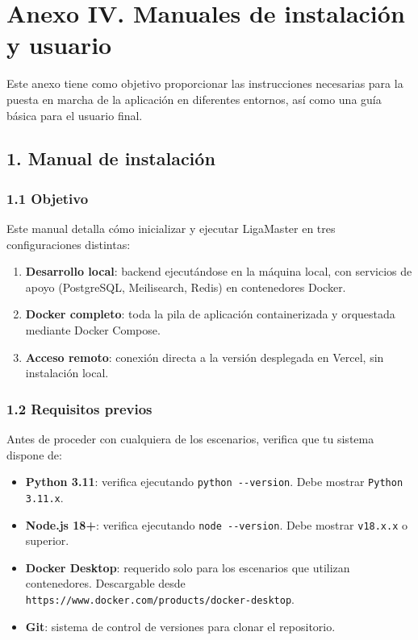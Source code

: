 \section*{Anexo IV. Manuales de instalación y usuario}
Este anexo tiene como objetivo proporcionar las instrucciones necesarias para la puesta en marcha de la aplicación en diferentes entornos, así como una guía básica para el usuario final.
\subsection*{1. Manual de instalación}


\subsubsection*{1.1 Objetivo}

Este manual detalla cómo inicializar y ejecutar LigaMaster en tres configuraciones distintas:

\begin{enumerate}
    \item \textbf{Desarrollo local}: backend ejecutándose en la máquina local, con servicios de apoyo (PostgreSQL, Meilisearch, Redis) en contenedores Docker.
    \item \textbf{Docker completo}: toda la pila de aplicación containerizada y orquestada mediante Docker Compose.
    \item \textbf{Acceso remoto}: conexión directa a la versión desplegada en Vercel, sin instalación local.
\end{enumerate}

\subsubsection*{1.2 Requisitos previos}

Antes de proceder con cualquiera de los escenarios, verifica que tu sistema dispone de:

\begin{itemize}
    \item \textbf{Python 3.11}: verifica ejecutando \texttt{python {-}{-}version}. Debe mostrar \texttt{Python 3.11.x}.
    \item \textbf{Node.js 18+}: verifica ejecutando \texttt{node {-}{-}version}. Debe mostrar \texttt{v18.x.x} o superior.
    \item \textbf{Docker Desktop}: requerido solo para los escenarios que utilizan contenedores. Descargable desde \texttt{https://www.docker.com/products/docker-desktop}.
    \item \textbf{Git}: sistema de control de versiones para clonar el repositorio.
\end{itemize}

